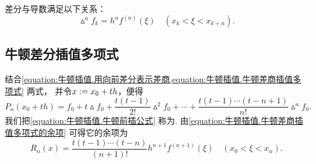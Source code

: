 差分与导数满足以下关系：\begin{equation*}
	\vartriangle^n f_k
	= h^n f^{(n)}(\xi)
	\quad(x_k < \xi < x_{k+n}).
\end{equation*}

\subsection{牛顿差分插值多项式}
结合\cref{equation:牛顿插值.用向前差分表示差商,equation:牛顿插值.牛顿差商插值多项式} 两式，
并令\(x := x_0 + t h\)，便得\begin{equation}\label{equation:牛顿插值.牛顿前插公式}
	P_n(x_0 + t h)
	= f_0
	+ t \vartriangle f_0
	+ \frac{t(t-1)}{2!} \vartriangle^2 f_0
	+ \dotsb
	+ \frac{t(t-1)\dotsm(t-n+1)}{n!} \vartriangle^n f_0.
\end{equation}
我们把\cref{equation:牛顿插值.牛顿前插公式}
称为.
由\cref{equation:牛顿插值.牛顿差商插值多项式的余项}
可得它的余项为\begin{equation}
	R_n(x)
	= \frac{t(t-1)\dotsm(t-n)}{(n+1)!} h^{n+1} f^{(n+1)}(\xi)
	\quad(x_0 < \xi < x_n).
\end{equation}
